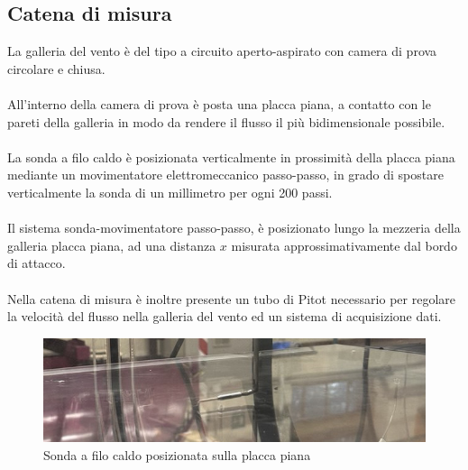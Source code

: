 \subsection{Catena di misura}
La galleria del vento è del tipo a circuito aperto-aspirato con camera di prova circolare e chiusa.\\\\
All'interno della camera di prova è posta una placca piana, a contatto con le pareti della galleria in modo da rendere il flusso il più bidimensionale possibile.\\\\
La sonda a filo caldo è posizionata verticalmente in prossimità della placca piana mediante un movimentatore elettromeccanico passo-passo, in grado di spostare verticalmente la sonda di un millimetro per ogni 200 passi.\\\\
Il sistema sonda-movimentatore passo-passo, è posizionato lungo la mezzeria della galleria placca piana, ad una distanza $x$ misurata approssimativamente dal bordo di attacco.\\\\
Nella catena di misura è inoltre presente un tubo di Pitot necessario per regolare la velocità del flusso nella galleria del vento ed un sistema di acquisizione dati.
\begin{figure}[H]
    \centering
    \includegraphics[width=.8\textwidth]{images/9/sonda.jpg}
    \caption{Sonda a filo caldo posizionata sulla placca piana}
\end{figure}

